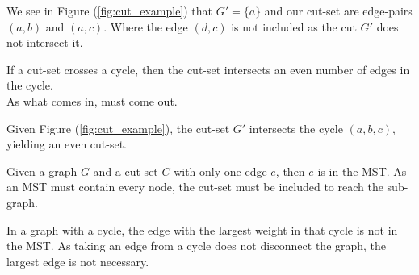 \noindent
We see in Figure (\ref{fig:cut_example}) that $G'=\{a\}$ and our cut-set are edge-pairs $(a,b)$ and $(a,c)$. Where the edge $(d,c)$ is not included as the cut $G'$ does not intersect it.
\begin{theo}

    If a cut-set crosses a cycle, then the cut-set intersects an even number of edges in the cycle.\\
    As what comes in, must come out.
\end{theo}
\noindent
Given Figure (\ref{fig:cut_example}), the cut-set $G'$ intersects the cycle $(a,b,c)$, yielding an even cut-set.

\begin{theo}

    Given a graph $G$ and a cut-set $C$ with only one edge $e$, then $e$ is in the MST. As an MST must contain every node, the cut-set must be included to reach the sub-graph.
\end{theo}
\begin{theo}
    
        In a graph with a cycle, the edge with the largest weight in that cycle is not in the MST.
        As taking an edge from a cycle does not disconnect the graph, the largest edge is not necessary.
\end{theo}

